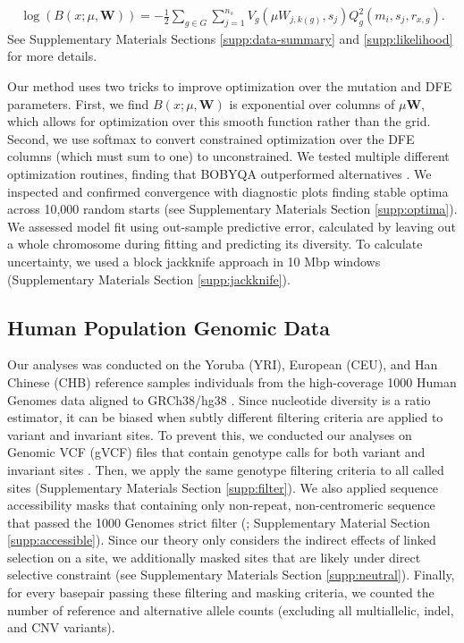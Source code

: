\documentclass[11pt]{article}
\begin{document}
\begin{align}
    \log\left(B(x; \mu, \mathbf{W}) \right) = - \frac{1}{2} \sum_{g \in G} \sum_{j=1}^{n_s} V_g(\mu W_{j, k(g)}, s_j) Q_g^2(m_i, s_j, r_{x, g}).
\end{align}
%
See Supplementary Materials Sections \ref{supp:data-summary} and
\ref{supp:likelihood} for more details.

Our method uses two tricks to improve optimization over the mutation and DFE
parameters. First, we find $B(x; \mu, \mathbf{W})$ is exponential over columns
of $\mu \mathbf{W}$, which allows for optimization over this smooth function
rather than the grid. Second, we use softmax to convert constrained
optimization over the DFE columns (which must sum to one) to unconstrained. We
tested multiple different optimization routines, finding that BOBYQA
outperformed alternatives \parencite{Powell2009-jm,Johnson2007-tl}. We
inspected and confirmed convergence with diagnostic plots finding stable optima
across 10,000 random starts (see Supplementary Materials Section
\ref{supp:optima}). We assessed model fit using out-sample predictive error,
calculated by leaving out a whole chromosome during fitting and predicting its
diversity. To calculate uncertainty, we used a block jackknife approach in 10
Mbp windows (Supplementary Materials Section \ref{supp:jackknife}).

\subsection*{Human Population Genomic Data}
\label{sec:methods-data}

Our analyses was conducted on the Yoruba (YRI), European (CEU), and Han Chinese
(CHB) reference samples individuals from the high-coverage 1000 Human Genomes
data aligned to GRCh38/hg38 \parencite{Byrska-Bishop2022-tn}. Since nucleotide
diversity is a ratio estimator, it can be biased when subtly different
filtering criteria are applied to variant and invariant sites. To prevent this,
we conducted our analyses on Genomic VCF (gVCF) files that contain genotype
calls for both variant and invariant sites \parencite{Illumina_Inc2020-dk}.
Then, we apply the same genotype filtering criteria to all called sites
(Supplementary Materials Section \ref{supp:filter}). We also applied sequence
accessibility masks that containing only non-repeat, non-centromeric sequence
that passed the 1000 Genomes strict filter
(\cite{1000_Genomes_Project_Consortium2015-mi}; Supplementary Material Section
\ref{supp:accessible}). Since our theory only considers the indirect effects of
linked selection on a site, we additionally masked sites that are likely under
direct selective constraint (see Supplementary Materials Section
\ref{supp:neutral}). Finally, for every basepair passing these filtering and
masking criteria, we counted the number of reference and alternative allele
counts (excluding all multiallelic, indel, and CNV variants).
\end{document}
